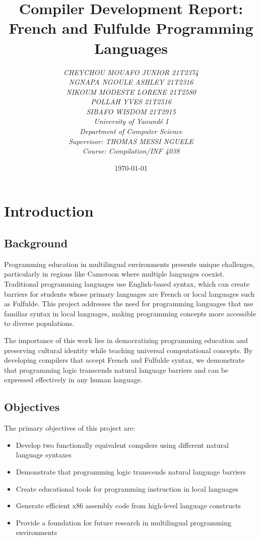 \documentclass[12pt,a4paper]{article}
\title{
    \vspace{-2cm}
    \huge\textbf{Compiler Development Report:} \\
    \LARGE\textbf{French and Fulfulde Programming Languages} \\
    \vspace{3cm}
}
\author{
    \textit{CHEYCHOU MOUAFO JUNIOR      21T2374} \\
    \textit{NGNAPA NGOULE ASHLEY      21T2316} \\
    \textit{NIKOUM MODESTE LORENE      21T2580} \\
    \textit{POLLAH YVES      21T2516} \\
    \vspace{1cm}
    \textit{SIBAFO WISDOM      21T2915} \\
    \textit{University of Yaoundé I} \\
    \textit{Department of Computer Science} \\
    \vspace{0.5cm}
    \textit{Supervisor: THOMAS MESSI NGUELE} \\
    \textit{Course: Compilation/INF 4038}
}
\date{\today}
\begin{document}
\maketitle
\thispagestyle{empty}

\vspace{2cm}

\newpage

\tableofcontents
\newpage

\listoffigures
\listoftables
\newpage

\section{Introduction}

\subsection{Background}

Programming education in multilingual environments presents unique challenges, particularly in regions like Cameroon where multiple languages coexist. Traditional programming languages use English-based syntax, which can create barriers for students whose primary languages are French or local languages such as Fulfulde. This project addresses the need for programming languages that use familiar syntax in local languages, making programming concepts more accessible to diverse populations.

The importance of this work lies in democratizing programming education and preserving cultural identity while teaching universal computational concepts. By developing compilers that accept French and Fulfulde syntax, we demonstrate that programming logic transcends natural language barriers and can be expressed effectively in any human language.

\subsection{Objectives}

The primary objectives of this project are:

\begin{itemize}
    \item Develop two functionally equivalent compilers using different natural language syntaxes
    \item Demonstrate that programming logic transcends natural language barriers
    \item Create educational tools for programming instruction in local languages
    \item Generate efficient x86 assembly code from high-level language constructs
    \item Provide a foundation for future research in multilingual programming environments
\end{itemize}
\end{document}
